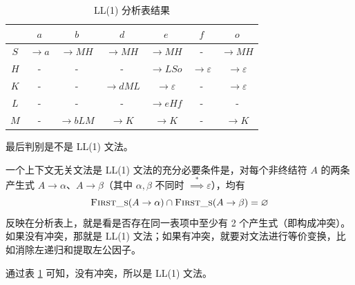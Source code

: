 \documentclass[UTF8]{ctexart}
\newcommand\FIRSTS{\textsc{First\_s}}
\newcommand\deduce{\overset{*}{\implies}} %
\begin{document}
\begin{table}[p]
    \centering
    \begin{tabular}{c|cccccc}
    \toprule
        & $a$ & $b$ & $d$ & $e$ & $f$ & $o$ \\
    \midrule
    $S$ & $\to a$ & $\to MH$ & $\to MH$ & $\to MH$ & - & $\to MH$ \\
    $H$ & - & - & - & $\to LSo$ & $\to\varepsilon$ & $\to\varepsilon$ \\
    $K$ & - & - & $\to dML$ & $\to\varepsilon$ & - & $\to\varepsilon$ \\
    $L$ & - & - & - & $\to eHf$ & - & - \\
    $M$ & - & $\to bLM$ & $\to K$ & $\to K$ & - & $\to K$\\
    \bottomrule
    \end{tabular}
    \caption{LL(1) 分析表结果}\label{tab:RESULT}
\end{table}

\newpage

最后判别是不是 LL(1) 文法。

\begin{tcolorbox}[colback=violet!5, colframe=violet, boxrule=1pt, ]
一个上下文无关文法是 LL(1) 文法的充分必要条件是，对每个非终结符 $A$ 的两条产生式 $A\to \alpha$、$A\to \beta$（其中 $\alpha,\beta$ 不同时 $\deduce\varepsilon$），均有
\begin{equation*}
    \FIRSTS(A\to\alpha) \cap \FIRSTS(A\to\beta) = \varnothing
\end{equation*}
反映在分析表上，就是看是否存在同一表项中至少有 2 个产生式（即构成冲突）。如果没有冲突，那就是 LL(1) 文法；如果有冲突，就要对文法进行等价变换，比如消除左递归和提取左公因子。
\end{tcolorbox}

通过表 \ref{tab:RESULT} 可知，没有冲突，所以是 LL(1) 文法。
\end{document}
